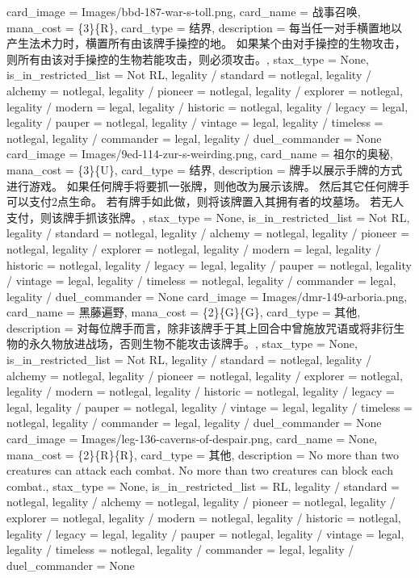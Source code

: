 \documentclass[lang = cn, color = black, 10pt]{AllThatStax}
\begin{document}
\card
{
	card_image = Images/bbd-187-war-s-toll.png,
	card_name = 战事召唤,
	mana_cost = \{3\}\{R\},
	card_type = 结界,
	description = 每当任一对手横置地以产生法术力时，横置所有由该牌手操控的地。
	如果某个由对手操控的生物攻击，则所有由该对手操控的生物若能攻击，则必须攻击。,
	stax_type = None,
	is_in_restricted_list = Not RL,
	legality / standard = notlegal,
	legality / alchemy = notlegal,
	legality / pioneer = notlegal,
	legality / explorer = notlegal,
	legality / modern = legal,
	legality / historic = notlegal,
	legality / legacy = legal,
	legality / pauper = notlegal,
	legality / vintage = legal,
	legality / timeless = notlegal,
	legality / commander = legal,
	legality / duel_commander = None
}
\card
{
	card_image = Images/9ed-114-zur-s-weirding.png,
	card_name = 祖尔的奥秘,
	mana_cost = \{3\}\{U\},
	card_type = 结界,
	description = 牌手以展示手牌的方式进行游戏。
	如果任何牌手将要抓一张牌，则他改为展示该牌。 然后其它任何牌手可以支付2点生命。 若有牌手如此做，则将该牌置入其拥有者的坟墓场。 若无人支付，则该牌手抓该张牌。,
	stax_type = None,
	is_in_restricted_list = Not RL,
	legality / standard = notlegal,
	legality / alchemy = notlegal,
	legality / pioneer = notlegal,
	legality / explorer = notlegal,
	legality / modern = legal,
	legality / historic = notlegal,
	legality / legacy = legal,
	legality / pauper = notlegal,
	legality / vintage = legal,
	legality / timeless = notlegal,
	legality / commander = legal,
	legality / duel_commander = None
}
\card
{
	card_image = Images/dmr-149-arboria.png,
	card_name = 黑藤遍野,
	mana_cost = \{2\}\{G\}\{G\},
	card_type = 其他,
	description = 对每位牌手而言，除非该牌手于其上回合中曾施放咒语或将非衍生物的永久物放进战场，否则生物不能攻击该牌手。,
	stax_type = None,
	is_in_restricted_list = Not RL,
	legality / standard = notlegal,
	legality / alchemy = notlegal,
	legality / pioneer = notlegal,
	legality / explorer = notlegal,
	legality / modern = notlegal,
	legality / historic = notlegal,
	legality / legacy = legal,
	legality / pauper = notlegal,
	legality / vintage = legal,
	legality / timeless = notlegal,
	legality / commander = legal,
	legality / duel_commander = None
}
\card
{
	card_image = Images/leg-136-caverns-of-despair.png,
	card_name = None,
	mana_cost = \{2\}\{R\}\{R\},
	card_type = 其他,
	description = No more than two creatures can attack each combat.
	No more than two creatures can block each combat.,
	stax_type = None,
	is_in_restricted_list = RL,
	legality / standard = notlegal,
	legality / alchemy = notlegal,
	legality / pioneer = notlegal,
	legality / explorer = notlegal,
	legality / modern = notlegal,
	legality / historic = notlegal,
	legality / legacy = legal,
	legality / pauper = notlegal,
	legality / vintage = legal,
	legality / timeless = notlegal,
	legality / commander = legal,
	legality / duel_commander = None
}
\end{document}

